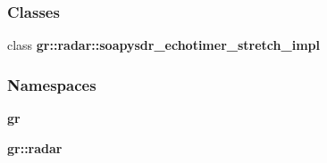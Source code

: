 \subsubsection*{Classes}
\begin{DoxyCompactItemize}
\item 
class {\bf gr\+::radar\+::soapysdr\+\_\+echotimer\+\_\+stretch\+\_\+impl}
\end{DoxyCompactItemize}
\subsubsection*{Namespaces}
\begin{DoxyCompactItemize}
\item 
 {\bf gr}
\item 
 {\bf gr\+::radar}
\end{DoxyCompactItemize}
